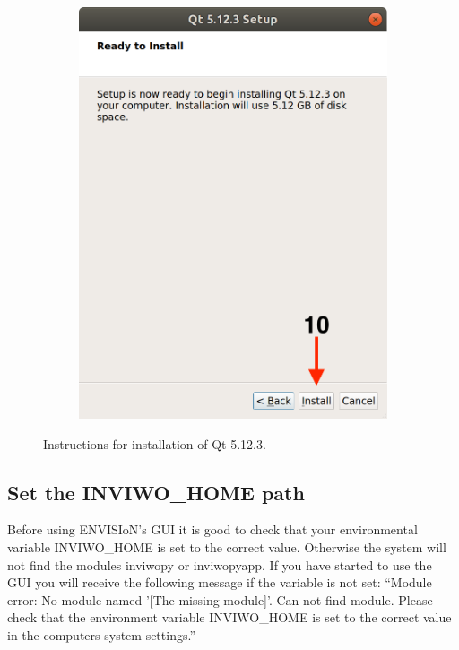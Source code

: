 \begin{figure}[H]
\begin{subfigure}{0.32\linewidth}
        \includegraphics[width=1\textwidth]{images/Qt8.png}
    \end{subfigure}
    \caption{Instructions for installation of Qt 5.12.3.}
    \label{fig:Qt}
\end{figure}

\subsection{Set the INVIWO\_HOME path}
Before using ENVISIoN's GUI it is good to check that your environmental variable INVIWO\_HOME is set to the correct value. Otherwise the system will not find the modules inviwopy or inviwopyapp. If you have started to use the GUI you will receive the following message if the variable is not set:
\newline 
``Module error: No module named '[The missing module]'. Can not find module. Please check that the environment variable INVIWO\_HOME is set to the correct value in the computers system settings.''
\newline


